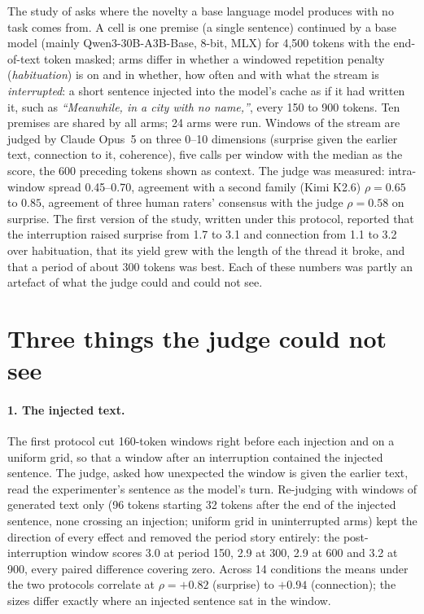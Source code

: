 \documentclass{article}
\begin{document}
The study of \citet{ono2026interrupting} asks where the novelty a base
language model produces with no task comes from. A cell is one premise (a
single sentence) continued by a base model (mainly Qwen3-30B-A3B-Base, 8-bit,
MLX) for 4{,}500 tokens with the end-of-text token masked; arms differ in
whether a windowed repetition penalty (\emph{habituation}) is on and in
whether, how often and with what the stream is \emph{interrupted}: a short
sentence injected into the model's cache as if it had written it, such as
\emph{``Meanwhile, in a city with no name,''}, every 150 to 900 tokens. Ten
premises are shared by all arms; 24 arms were run. Windows of the stream are
judged by Claude Opus~5 on three 0--10 dimensions (surprise given the earlier
text, connection to it, coherence), five calls per window with the median as
the score, the 600 preceding tokens shown as context. The judge was measured:
intra-window spread 0.45--0.70, agreement with a second family (Kimi K2.6)
$\rho=0.65$ to $0.85$, agreement of three human raters' consensus with the
judge $\rho=0.58$ on surprise. The first version of the study, written under
this protocol, reported that the interruption raised surprise from 1.7 to 3.1
and connection from 1.1 to 3.2 over habituation, that its yield grew with the
length of the thread it broke, and that a period of about 300 tokens was
best. Each of these numbers was partly an artefact of what the judge could
and could not see.

\section{Three things the judge could not see}

\paragraph{1. The injected text.} The first protocol cut 160-token windows
right before each injection and on a uniform grid, so that a window after an
interruption contained the injected sentence. The judge, asked how unexpected
the window is given the earlier text, read the experimenter's sentence as the
model's turn. Re-judging with windows of generated text only (96 tokens
starting 32 tokens after the end of the injected sentence, none crossing an
injection; uniform grid in uninterrupted arms) kept the direction of every
effect and removed the period story entirely: the post-interruption window
scores 3.0 at period 150, 2.9 at 300, 2.9 at 600 and 3.2 at 900, every paired
difference covering zero. Across 14 conditions the means under the two
protocols correlate at $\rho=+0.82$ (surprise) to $+0.94$ (connection); the
sizes differ exactly where an injected sentence sat in the window.
\end{document}
